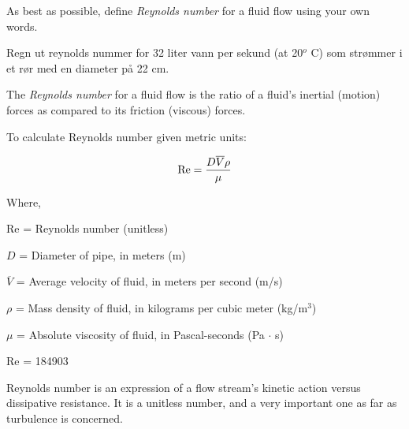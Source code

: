 

As best as possible, define {\it Reynolds number} for a fluid flow using your own words.

\vskip 10pt

Regn ut reynolds nummer for 32 liter vann per sekund (at 20$^{o}$ C) som strømmer i et rør med en diameter på 22 cm. 








The {\it Reynolds number} for a fluid flow is the ratio of a fluid's inertial (motion) forces as compared to its friction (viscous) forces.

\vskip 30pt
 
To calculate Reynolds number given metric units:

$$\hbox{Re} = {{D \overline{V} \rho} \over \mu}$$

\noindent
Where,

Re = Reynolds number (unitless)

$D$ = Diameter of pipe, in meters (m)

$\overline{V}$ = Average velocity of fluid, in meters per second (m/s)

$\rho$ = Mass density of fluid, in kilograms per cubic meter (kg/m$^{3}$)

$\mu$ = Absolute viscosity of fluid, in Pascal-seconds (Pa $\cdot$ s)

\vskip 60pt \goodbreak

Re = 184903







Reynolds number is an expression of a flow stream's kinetic action versus dissipative resistance.  It is a unitless number, and a very important one as far as turbulence is concerned.




